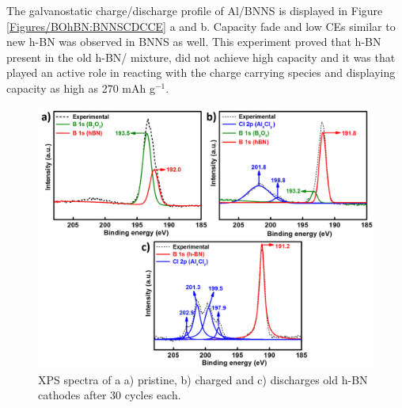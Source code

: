The galvanostatic charge/discharge profile of Al/BNNS is displayed in Figure \ref{Figures/BOhBN:BNNSCDCCE} a and b. Capacity fade and low CEs similar to new h-BN was observed in BNNS as well. This experiment proved that h-BN present in the old h-BN/  mixture, did not achieve high capacity and it was  that played an active role in reacting with the charge carrying species and displaying capacity as high as 270 mAh g$^{-1}$.
\begin{figure}[tbh!]
\centering
\includegraphics[width=\textwidth]{Figures/BOhBN/oldhBNXPS}
\caption{XPS spectra of a a) pristine, b) charged and c) discharges old h-BN cathodes after 30 cycles each.}
\label{Figures/BOhBN:oldhBNXPS}
\end{figure}

